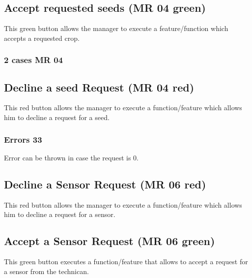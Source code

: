 \subsection{Accept requested seeds (MR 04 green)}
This green button allows the manager to execute a feature/function which accepts
a requested crop. 
\subsubsection{2 cases MR 04}


\subsection{Decline a seed Request (MR 04 red)}
This red button allows the manager to execute a function/feature which allows
him to decline a request for a seed.

\subsubsection{Errors 33}
Error can be thrown in case the request is 0.


\subsection{Decline a Sensor Request (MR 06 red)}
This red button allows the manager to execute a function/feature which allows
him to decline a request for a sensor.
\subsection{Accept a Sensor Request (MR 06 green)}
This green button executes a function/feature that allows to accept a request
for a sensor from the technican.




